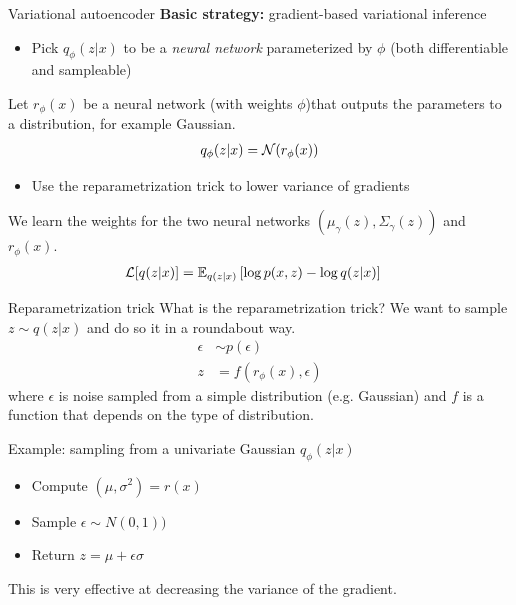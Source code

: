 \documentclass[10pt, compress]{beamer}
\begin{document}
\begin{frame}{Variational autoencoder}
  \textbf{Basic strategy:} gradient-based variational inference

  \pause

  \begin{itemize}
    \item Pick $q_\phi(z | x)$ to be a \emph{neural network} parameterized by $\phi$ (both differentiable and sampleable)
  \end{itemize}

  \pause
  Let $r_\phi(x)$ be a neural network (with weights $\phi$)that outputs the parameters to a distribution, for example Gaussian.
  \begin{align*}
    q_\phi(z | x) = \mathcal{N}(r_\phi(x))
  \end{align*}

  \pause

  \begin{itemize}
    \item Use the reparametrization trick to lower variance of gradients
  \end{itemize}
  \pause
  We learn the weights for the two neural networks $(\mu_\gamma(z), \Sigma_\gamma(z))$ and $r_\phi(x)$.
  \pause
  \begin{align*}
    \mathcal{L}[q(z | x)] &= \mathbb{E}_{q(z | x)}\left[\log p(x, z) - \log q(z | x)\right]
  \end{align*}
\end{frame}

\begin{frame}{Reparametrization trick}
  What is the reparametrization trick?
  \pause
  We want to sample $z \sim q(z | x)$ and do so
  it in a roundabout way.
  \begin{align*}
    \epsilon &\sim p(\epsilon) \\
    z &= f(r_\phi(x), \epsilon)
  \end{align*}
  where $\epsilon$ is noise sampled from a simple distribution (e.g. Gaussian)
  and $f$ is a function that depends on the type of distribution.
  \pause
  \begin{block}{Example: sampling from a univariate Gaussian $q_\phi(z | x)$}
    \begin{itemize}
        \pause
      \item Compute $(\mu, \sigma^2) = r(x)$
        \pause
      \item Sample $\epsilon \sim N(0, 1))$
        \pause
      \item Return $z = \mu + \epsilon\sigma$
    \end{itemize}
  \end{block}
  \pause
  This is very effective at decreasing the variance of the gradient.
\end{frame}
\end{document}
